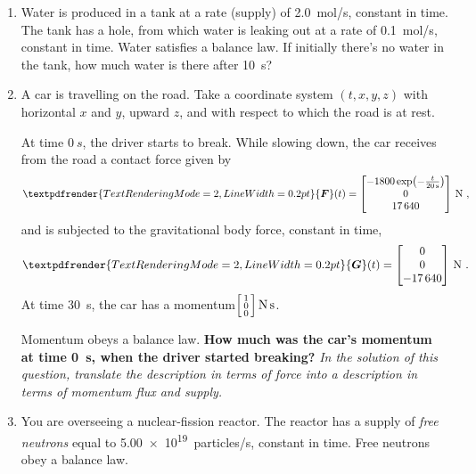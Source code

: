 \documentclass[a4paper,12pt,%
onecolumn,oneside,%
british%
]{memoir}
\renewcommand*{\bm}[1]{\textpdfrender{TextRenderingMode=2,LineWidth=0.2pt}{\boldsymbol{#1}}}
\renewcommand*{\|}[1][]{\nonscript\:#1\vert\nonscript\:\mathopen{}}
\newcommand*{\yF}{\bm{F}}
\newcommand*{\yG}{\bm{G}}
\begin{document}
\begin{enumerate}[exerc]
\item Water is produced in a tank at a rate (supply) of \qty{2.0}{mol/s}, constant in time. The tank has a hole, from which water is leaking out at a rate of \qty{0.1}{mol/s}, constant in time. Water satisfies a balance law. If initially there's no water in the tank, how much water is there after \qty{10}{s}?

\item A car is travelling on the road. Take a coordinate system $(t,x,y,z)$ with horizontal $x$ and $y$, upward $z$, and with respect to which the road is at rest.

  At time $\qty{0}{s}$, the driver starts to break. While slowing down, the car receives from the road a contact force given by
  \begin{equation*}
    \yF(t) =
    \begin{bmatrix}
      -\num{1800}\exp\bigl(-\frac{t}{\qty{20}{s}}\bigr)
      \\
      0
      \\
      \num{17640}
    \end{bmatrix}\,\unit{N} \ ,
  \end{equation*}
and is subjected to the gravitational body force, constant in time,
\begin{equation*}
  \yG(t) = \begin{bmatrix}
    0
      \\
      0
      \\
      -\num{17640}
    \end{bmatrix}\,\unit{N} \ .
  \end{equation*}
  At time \qty{30}{s}, the car has a momentum\enspace$
  \begin{bsmallmatrix}
    1\\0\\0
  \end{bsmallmatrix}\,\unit{N\,s}
  $.

  Momentum obeys a balance law. \textbf{How much was the car's momentum at time \qty{0}{s}, when the driver started breaking?}  \emph{In the solution of this question, translate the description in terms of force into a description in terms of momentum flux and supply.}

\item {}%
  You are overseeing a nuclear-fission reactor. The reactor has a supply of \emph{free neutrons} equal to \qty{5.00e19}{particles/s}, constant in time. Free neutrons obey a balance law.


\end{enumerate}
\end{document}
